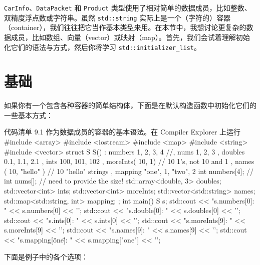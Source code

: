 \texttt{CarInfo}、\texttt{DataPacket} 和 \texttt{Product} 类型使用了相对简单的数据成员，比如整数、双精度浮点数或字符串。虽然 \texttt{std::string} 实际上是一个（字符的）容器（container），我们往往把它当作基本类型来用。在本节中，我想讨论更复杂的数据成员，比如数组、向量（vector）或映射（map）。首先，我们会试着理解初始化它们的语法与方式，然后你将学习 \texttt{std::initializer\_list}。

\section{基础}

如果你有一个包含各种容器的简单结构体，下面是在默认构造函数中初始化它们的一些基本方式：

\begin{codeboxt}[cpp]{代码清单 9.1 作为数据成员的容器的基本语法。在 Compiler Explorer 上运行}
#include <array>
#include <iostream>
#include <map>
#include <string>
#include <vector>
struct S {
    S()
    : numbers { 1, 2, 3, 4}
    //, nums { 1, 2, 3}
    , doubles { 0.1, 1.1, 2.1 }
    , ints { 100, 101, 102}
    , moreInts( 10, 1) // 10 1's, not 10 and 1
    , names ( 10, "hello" ) // 10 "hello" strings
    , mapping { {"one", 1}, {"two", 2} }
    { }
    int numbers[4];
    // int nums[]; // need to provide the size!
    std::array<double, 3> doubles;
    std::vector<int> ints;
    std::vector<int> moreInts;
    std::vector<std::string> names;
    std::map<std::string, int> mapping;
};
int main() {
    S s;
    std::cout << "s.numbers[0]: " << s.numbers[0] << '\n';
    std::cout << "s.double[0]: " << s.doubles[0] << '\n';
    std::cout << "s.ints[0]: " << s.ints[0] << '\n';
    std::cout << "s.moreInts[9]: " << s.moreInts[9] << '\n';
    std::cout << "s.names[9]: " << s.names[9] << '\n';
    std::cout << "s.mapping[\"one\"]: " << s.mapping["one"] << '\n';
}
\end{codeboxt}

下面是例子中的各个选项：

